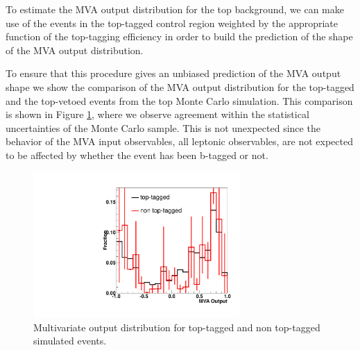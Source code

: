 To estimate the MVA output distribution for the top background, we can make use of the 
events in the top-tagged control region weighted by the appropriate function
of the top-tagging efficiency in order to build the prediction of the shape of the
MVA output distribution.

To ensure that this procedure gives an unbiased prediction of the MVA output shape
we show the comparison of the MVA output distribution for the top-tagged 
and the top-vetoed events from the top Monte Carlo simulation. This comparison is shown in
Figure \ref{fig:mva_top}, where we observe agreement within the statistical
uncertainties of the Monte Carlo sample. This is not unexpected since the behavior of
the MVA input observables, all leptonic observables, are not expected to be affected by
whether the event has been b-tagged or not. 

\begin{figure}[!htbp]
\begin{center}
\includegraphics[width=0.7\textwidth]{figures/mva_top.pdf}
\caption{Multivariate output distribution for top-tagged and non top-tagged simulated events.}
\label{fig:mva_top}
\end{center}
\end{figure}



 
